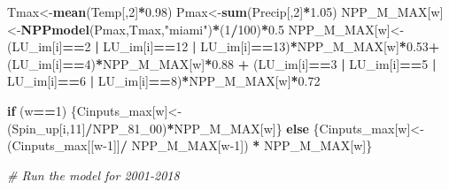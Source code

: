 \documentclass[
  10pt,
  b5paper,
]{book}
\newenvironment{Shaded}{\begin{snugshade}}{\end{snugshade}}
\newcommand{\CommentTok}[1]{\textcolor[rgb]{0.56,0.35,0.01}{\textit{#1}}}
\newcommand{\ControlFlowTok}[1]{\textcolor[rgb]{0.13,0.29,0.53}{\textbf{#1}}}
\newcommand{\DecValTok}[1]{\textcolor[rgb]{0.00,0.00,0.81}{#1}}
\newcommand{\FloatTok}[1]{\textcolor[rgb]{0.00,0.00,0.81}{#1}}
\newcommand{\KeywordTok}[1]{\textcolor[rgb]{0.13,0.29,0.53}{\textbf{#1}}}
\newcommand{\NormalTok}[1]{#1}
\newcommand{\OperatorTok}[1]{\textcolor[rgb]{0.81,0.36,0.00}{\textbf{#1}}}
\newcommand{\StringTok}[1]{\textcolor[rgb]{0.31,0.60,0.02}{#1}}
\begin{document}
\begin{Shaded}
\begin{Highlighting}[]
{\NormalTok{Tmax<-}\KeywordTok{mean}\NormalTok{(Temp[,}\DecValTok{2}\NormalTok{]}\OperatorTok{*}\FloatTok{0.98}\NormalTok{)}
\NormalTok{Pmax<-}\KeywordTok{sum}\NormalTok{(Precip[,}\DecValTok{2}\NormalTok{]}\OperatorTok{*}\FloatTok{1.05}\NormalTok{)}
\NormalTok{NPP_M_MAX[w]<-}\KeywordTok{NPPmodel}\NormalTok{(Pmax,Tmax,}\StringTok{"miami"}\NormalTok{)}\OperatorTok{*}\NormalTok{(}\DecValTok{1}\OperatorTok{/}\DecValTok{100}\NormalTok{)}\OperatorTok{*}\FloatTok{0.5}
\NormalTok{NPP_M_MAX[w]<-(LU_im[i]}\OperatorTok{==}\DecValTok{2} \OperatorTok{|}\StringTok{ }\NormalTok{LU_im[i]}\OperatorTok{==}\DecValTok{12} \OperatorTok{|}\StringTok{ }\NormalTok{LU_im[i]}\OperatorTok{==}\DecValTok{13}\NormalTok{)}\OperatorTok{*}\NormalTok{NPP_M_MAX[w]}\OperatorTok{*}\FloatTok{0.53}\OperatorTok{+}\StringTok{ }\NormalTok{(LU_im[i]}\OperatorTok{==}\DecValTok{4}\NormalTok{)}\OperatorTok{*}\NormalTok{NPP_M_MAX[w]}\OperatorTok{*}\FloatTok{0.88} \OperatorTok{+}\StringTok{ }\NormalTok{(LU_im[i]}\OperatorTok{==}\DecValTok{3} \OperatorTok{|}\StringTok{ }\NormalTok{LU_im[i]}\OperatorTok{==}\DecValTok{5} \OperatorTok{|}\StringTok{ }\NormalTok{LU_im[i]}\OperatorTok{==}\DecValTok{6} \OperatorTok{|}\StringTok{ }\NormalTok{LU_im[i]}\OperatorTok{==}\DecValTok{8}\NormalTok{)}\OperatorTok{*}\NormalTok{NPP_M_MAX[w]}\OperatorTok{*}\FloatTok{0.72}

\ControlFlowTok{if}\NormalTok{ (w}\OperatorTok{==}\DecValTok{1}\NormalTok{) \{Cinputs_max[w]<-(Spin_up[i,}\DecValTok{11}\NormalTok{]}\OperatorTok{/}\NormalTok{NPP_}\DecValTok{81}\NormalTok{_}\DecValTok{00}\NormalTok{)}\OperatorTok{*}\NormalTok{NPP_M_MAX[w]\} }\ControlFlowTok{else}\NormalTok{ \{Cinputs_max[w]<-(Cinputs_max[[w}\DecValTok{-1}\NormalTok{]]}\OperatorTok{/}\StringTok{ }\NormalTok{NPP_M_MAX[w}\DecValTok{-1}\NormalTok{]) }\OperatorTok{*}\StringTok{ }\NormalTok{NPP_M_MAX[w]\} }

\CommentTok{# Run the model for 2001-2018 }

}
\end{Highlighting}
\end{Shaded}
\end{document}
